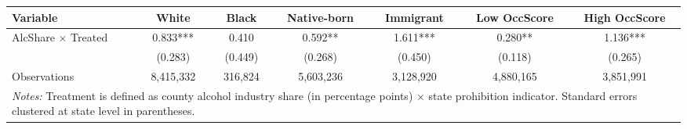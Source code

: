 
\begin{tabular}{lcccccc}
\toprule
Variable & White & Black & Native-born & Immigrant & Low OccScore & High OccScore\\
\midrule
AlcShare $\times$ Treated & 0.833*** & 0.410 & 0.592** & 1.611*** & 0.280** & 1.136***\\
 & (0.283) & (0.449) & (0.268) & (0.450) & (0.118) & (0.265)\\
Observations & 8,415,332 & 316,824 & 5,603,236 & 3,128,920 & 4,880,165 & 3,851,991\\
\bottomrule
\multicolumn{7}{p{0.95\textwidth}}{\footnotesize \emph{Notes:} Treatment is defined as county alcohol industry share (in percentage points) $\times$ state prohibition indicator. Standard errors clustered at state level in parentheses.}\\
\end{tabular}
